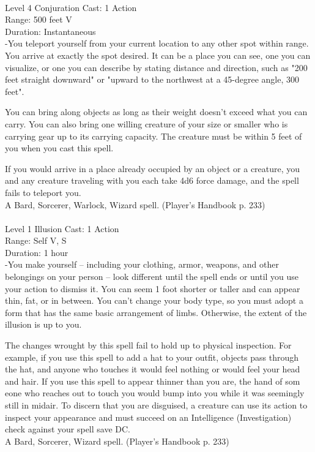 \documentclass[10pt,twocolumn]{report}
\begin{document}
 \\
Level 4 \quad Conjuration \quad Cast: 1 Action\\
Range: 500 feet \quad V\\
Duration: Instantaneous \quad \\
-You teleport yourself from your current location to any other spot within range. You arrive at exactly the spot desired. It can be a place you can see, one you can visualize, or one you can describe by stating distance and direction, such as "200 feet straight downward" or "upward to the northwest at a 45-degree angle, 300 feet". 

You can bring along objects as long as their weight doesn’t exceed what you can carry. You can also bring one willing creature of your size or smaller who is carrying gear up to its carrying capacity. The creature must be within 5 feet of you when you cast this spell. 

If you would arrive in a place already occupied by an object or a creature, you and any creature traveling with you each take 4d6 force damage, and the spell fails to teleport you.\\
A Bard, Sorcerer, Warlock, Wizard spell. (Player's Handbook p. 233) \\


 \\
Level 1 \quad Illusion \quad Cast: 1 Action\\
Range: Self \quad V, S\\
Duration: 1 hour \quad \\
-You make yourself – including your clothing, armor, weapons, and other belongings on your person – look different until the spell ends or until you use your action to dismiss it. 
You can seem  1 foot shorter or taller and can appear thin, fat, or in between. You can’t change your body type, so you must adopt a form that has the same basic arrangement of limbs. Otherwise, the extent of the illusion is up to you. 

The changes wrought by this spell fail to hold up to physical inspection. For example, if you use this spell to add a hat to your outfit, objects pass through the hat, and anyone who touches it would feel nothing or would feel your head and hair. If you use this spell to appear thinner than you are, the hand of som eone who reaches out to touch you would bump into you while it was seemingly still in midair. To discern that you are disguised, a creature can use its action to inspect your appearance and must succeed on an Intelligence (Investigation) check against your spell save DC.\\
A Bard, Sorcerer, Wizard spell. (Player's Handbook p. 233) \\
\end{document}
